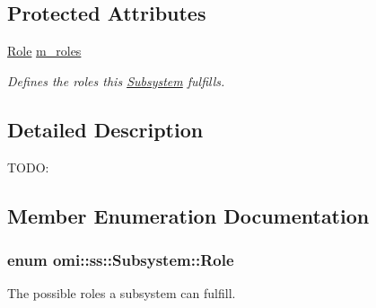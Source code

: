 \subsection*{Protected Attributes}
\begin{DoxyCompactItemize}
\item 
\hyperlink{classomi_1_1ss_1_1_subsystem_a4dd37e93b7d0b1b3926107258d5564f1}{Role} \hyperlink{classomi_1_1ss_1_1_subsystem_ae5c24401a0352ee48f87e19c8e751c5d}{m\+\_\+roles}\hypertarget{classomi_1_1ss_1_1_subsystem_ae5c24401a0352ee48f87e19c8e751c5d}{}\label{classomi_1_1ss_1_1_subsystem_ae5c24401a0352ee48f87e19c8e751c5d}

\begin{DoxyCompactList}\small\item\em Defines the roles this \hyperlink{classomi_1_1ss_1_1_subsystem}{Subsystem} fulfills. \end{DoxyCompactList}\end{DoxyCompactItemize}


\subsection{Detailed Description}
T\+O\+DO\+: 

\subsection{Member Enumeration Documentation}
\subsubsection[{\texorpdfstring{Role}{Role}}]{\setlength{\rightskip}{0pt plus 5cm}enum {\bf omi\+::ss\+::\+Subsystem\+::\+Role}}\hypertarget{classomi_1_1ss_1_1_subsystem_a4dd37e93b7d0b1b3926107258d5564f1}{}\label{classomi_1_1ss_1_1_subsystem_a4dd37e93b7d0b1b3926107258d5564f1}


The possible roles a subsystem can fulfill. 

